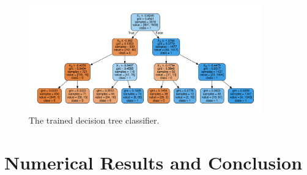 \documentclass{article}
\begin{document}
\begin{figure}[h]
  \centering
  \includegraphics[width=0.9\textwidth]{figs/tree_structure.pdf}
  \caption{The trained decision tree classifier.}
  \label{fig:tree_structure}
\end{figure}

\section{Numerical Results and Conclusion}




%
%



\end{document}
